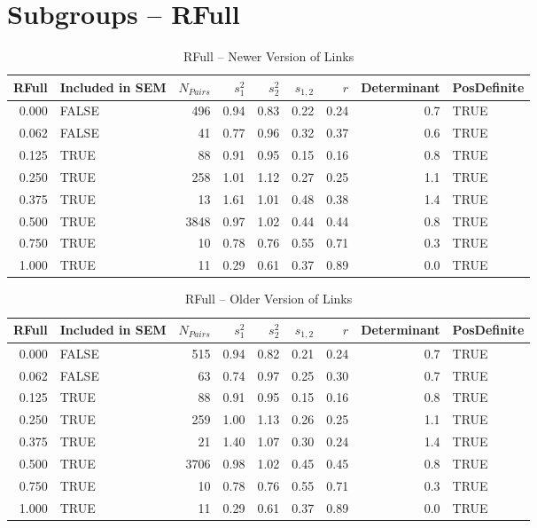 \documentclass{article}\usepackage[]{graphicx}\usepackage[]{color}
\begin{document}
\section{Subgroups --  RFull }%
\begin{table}[ht]
\centering
\begin{tabular}{rlrrrrrrl}
  \hline
RFull & Included in SEM & $N_{Pairs}$ & $s_1^2$ & $s_2^2$ & $s_{1,2}$ & $r$ & Determinant & PosDefinite \\ 
  \hline
0.000 & FALSE & 496 & 0.94 & 0.83 & 0.22 & 0.24 & 0.7 & TRUE \\ 
  0.062 & FALSE & 41 & 0.77 & 0.96 & 0.32 & 0.37 & 0.6 & TRUE \\ 
  0.125 & TRUE & 88 & 0.91 & 0.95 & 0.15 & 0.16 & 0.8 & TRUE \\ 
  0.250 & TRUE & 258 & 1.01 & 1.12 & 0.27 & 0.25 & 1.1 & TRUE \\ 
  0.375 & TRUE & 13 & 1.61 & 1.01 & 0.48 & 0.38 & 1.4 & TRUE \\ 
  0.500 & TRUE & 3848 & 0.97 & 1.02 & 0.44 & 0.44 & 0.8 & TRUE \\ 
  0.750 & TRUE & 10 & 0.78 & 0.76 & 0.55 & 0.71 & 0.3 & TRUE \\ 
  1.000 & TRUE & 11 & 0.29 & 0.61 & 0.37 & 0.89 & 0.0 & TRUE \\ 
   \hline
\end{tabular}
\caption{RFull -- Newer Version of Links} 
\end{table}
\begin{table}[ht]
\centering
\begin{tabular}{rlrrrrrrl}
  \hline
RFull & Included in SEM & $N_{Pairs}$ & $s_1^2$ & $s_2^2$ & $s_{1,2}$ & $r$ & Determinant & PosDefinite \\ 
  \hline
0.000 & FALSE & 515 & 0.94 & 0.82 & 0.21 & 0.24 & 0.7 & TRUE \\ 
  0.062 & FALSE & 63 & 0.74 & 0.97 & 0.25 & 0.30 & 0.7 & TRUE \\ 
  0.125 & TRUE & 88 & 0.91 & 0.95 & 0.15 & 0.16 & 0.8 & TRUE \\ 
  0.250 & TRUE & 259 & 1.00 & 1.13 & 0.26 & 0.25 & 1.1 & TRUE \\ 
  0.375 & TRUE & 21 & 1.40 & 1.07 & 0.30 & 0.24 & 1.4 & TRUE \\ 
  0.500 & TRUE & 3706 & 0.98 & 1.02 & 0.45 & 0.45 & 0.8 & TRUE \\ 
  0.750 & TRUE & 10 & 0.78 & 0.76 & 0.55 & 0.71 & 0.3 & TRUE \\ 
  1.000 & TRUE & 11 & 0.29 & 0.61 & 0.37 & 0.89 & 0.0 & TRUE \\ 
   \hline
\end{tabular}
\caption{RFull -- Older Version of Links} 
\end{table}
\end{document}
